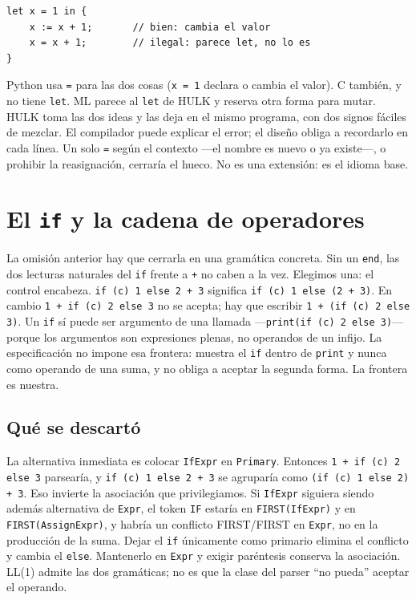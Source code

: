 \documentclass[11pt,a4paper]{article}
\begin{document}
\begin{lstlisting}[language={},numbers=none]
let x = 1 in {
    x := x + 1;       // bien: cambia el valor
    x = x + 1;        // ilegal: parece let, no lo es
}
\end{lstlisting}

Python usa \texttt{=} para las dos cosas (\texttt{x = 1} declara o cambia el valor). C también, y no tiene \texttt{let}. ML parece al \texttt{let} de HULK y reserva otra forma para mutar. HULK toma las dos ideas y las deja en el mismo programa, con dos signos fáciles de mezclar. El compilador puede explicar el error; el diseño obliga a recordarlo en cada línea. Un solo \texttt{=} según el contexto ---el nombre es nuevo o ya existe---, o prohibir la reasignación, cerraría el hueco. No es una extensión: es el idioma base.

\section{El \texttt{if} y la cadena de operadores}

La omisión anterior hay que cerrarla en una gramática concreta. Sin un \texttt{end}, las dos lecturas naturales del \texttt{if} frente a \texttt{+} no caben a la vez. Elegimos una: el control encabeza. \texttt{if (c) 1 else 2 + 3} significa \texttt{if (c) 1 else (2 + 3)}. En cambio \texttt{1 + if (c) 2 else 3} no se acepta; hay que escribir \texttt{1 + (if (c) 2 else 3)}. Un \texttt{if} sí puede ser argumento de una llamada ---\texttt{print(if (c) 2 else 3)}--- porque los argumentos son expresiones plenas, no operandos de un infijo. La especificación no impone esa frontera: muestra el \texttt{if} dentro de \texttt{print} y nunca como operando de una suma, y no obliga a aceptar la segunda forma. La frontera es nuestra.

\subsection{Qué se descartó}

La alternativa inmediata es colocar \texttt{IfExpr} en \texttt{Primary}. Entonces \texttt{1 + if (c) 2 else 3} parsearía, y \texttt{if (c) 1 else 2 + 3} se agruparía como \texttt{(if (c) 1 else 2) + 3}. Eso invierte la asociación que privilegiamos. Si \texttt{IfExpr} siguiera siendo además alternativa de \texttt{Expr}, el token \texttt{IF} estaría en \texttt{FIRST(IfExpr)} y en \texttt{FIRST(AssignExpr)}, y habría un conflicto FIRST/FIRST en \texttt{Expr}, no en la producción de la suma. Dejar el \texttt{if} únicamente como primario elimina el conflicto y cambia el \texttt{else}. Mantenerlo en \texttt{Expr} y exigir paréntesis conserva la asociación. LL(1) admite las dos gramáticas; no es que la clase del parser ``no pueda'' aceptar el operando.
\end{document}
